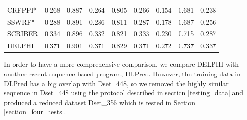 \begin{table}[htbp]
\begin{tabular}{lrrrrrrrr}
    CRFPPI* & \cellcolor[rgb]{ .698,  .78,  .643}0.268 & \cellcolor[rgb]{ .635,  .733,  .569}0.887 & \cellcolor[rgb]{ .714,  .792,  .659}0.264 & \cellcolor[rgb]{ .667,  .757,  .604}0.805 & \cellcolor[rgb]{ .706,  .784,  .651}0.266 & \cellcolor[rgb]{ .698,  .78,  .643}0.154 & \cellcolor[rgb]{ .502,  .635,  .412}0.681 & \cellcolor[rgb]{ .706,  .784,  .651}0.238 \\
    SSWRF* & \cellcolor[rgb]{ .627,  .729,  .561}0.288 & \cellcolor[rgb]{ .549,  .671,  .471}0.891 & \cellcolor[rgb]{ .635,  .733,  .569}0.286 & \cellcolor[rgb]{ .584,  .694,  .506}0.811 & \cellcolor[rgb]{ .631,  .729,  .565}0.287 & \cellcolor[rgb]{ .624,  .725,  .557}0.178 & \cellcolor[rgb]{ .482,  .624,  .388}0.687 & \cellcolor[rgb]{ .639,  .737,  .573}0.256 \\
    SCRIBER & \cellcolor[rgb]{ .463,  .608,  .365}0.334 & \cellcolor[rgb]{ .443,  .592,  .341}0.896 & \cellcolor[rgb]{ .471,  .612,  .373}0.332 & \cellcolor[rgb]{ .443,  .592,  .341}0.821 & \cellcolor[rgb]{ .467,  .612,  .369}0.333 & \cellcolor[rgb]{ .463,  .608,  .365}0.230 & \cellcolor[rgb]{ .4,  .561,  .29}0.715 & \cellcolor[rgb]{ .522,  .651,  .435}0.287 \\
    DELPHI & \cellcolor[rgb]{ .329,  .51,  .208}0.371 & \cellcolor[rgb]{ .329,  .51,  .208}0.901 & \cellcolor[rgb]{ .329,  .51,  .208}0.371 & \cellcolor[rgb]{ .329,  .51,  .208}0.829 & \cellcolor[rgb]{ .329,  .51,  .208}0.371 & \cellcolor[rgb]{ .329,  .51,  .208}0.272 & \cellcolor[rgb]{ .329,  .51,  .208}0.737 & \cellcolor[rgb]{ .329,  .51,  .208}0.337 \\
    \end{tabular}%
  \label{tab_comp_448}%
\end{table}%

In order to have a more comprehensive comparison, we compare DELPHI with another recent sequence-based program, DLPred. However, the training data in DLPred has a big overlap with Dset\_448, so we removed the highly similar sequence in Dset\_448 using the protocol described in section \ref{testing_data} and produced a reduced dataset Dset\_355 which is tested in Section \ref{section_four_tests}. 

